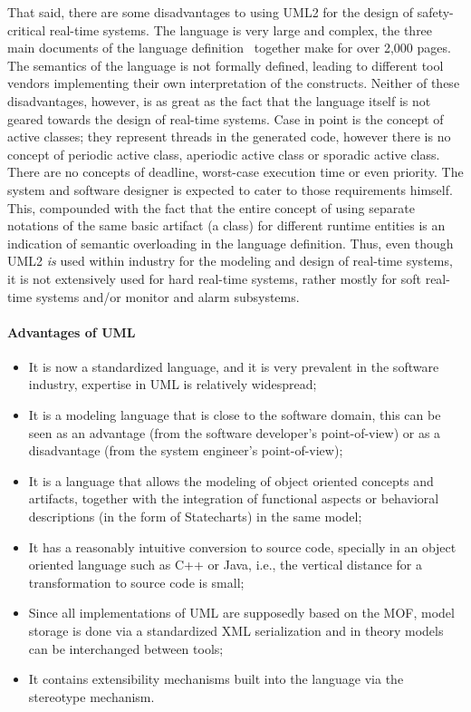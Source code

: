 That said, there are some disadvantages to using UML2 for the design
of safety-critical real-time systems. The language is very large and
complex, the three main documents of the language
definition~\cite{mof-std, uml-infra, uml-super} together make for over
2,000 pages. The semantics of the language is not formally defined,
leading to different tool vendors implementing their own
interpretation of the constructs. Neither of these disadvantages,
however, is as great as the fact that the language itself is not
geared towards the design of real-time systems. Case in point is the
concept of active classes; they represent threads in the generated
code, however there is no concept of periodic active class, aperiodic
active class or sporadic active class. There are no concepts of
deadline, worst-case execution time or even priority. The system and
software designer is expected to cater to those requirements
himself. This, compounded with the fact that the entire concept of
using separate notations of the same basic artifact (a class) for
different runtime entities is an indication of semantic overloading in
the language definition. Thus, even though UML2 \emph{is} used within
industry for the modeling and design of real-time systems, it is not
extensively used for hard real-time systems, rather mostly for soft
real-time systems and/or monitor and alarm subsystems.

\paragraph{Advantages of UML}
\begin{itemize}
\item{It is now a standardized language, and it is very prevalent in
  the software industry, expertise in UML is relatively widespread;}
\item{It is a modeling language that is close to the software domain,
  this can be seen as an advantage (from the software developer's
  point-of-view) or as a disadvantage (from the system engineer's
  point-of-view);}
\item{It is a language that allows the modeling of object oriented
  concepts and artifacts, together with the integration of functional
  aspects or behavioral descriptions (in the form of Statecharts) in
  the same model;}
\item{It has a reasonably intuitive conversion to source code,
  specially in an object oriented language such as C++ or Java, i.e.,
  the vertical distance for a transformation to source code is small;}
\item{Since all implementations of UML are supposedly based on the
  MOF, model storage is done via a standardized XML serialization and
  in theory models can be interchanged between tools;}
\item{It contains extensibility mechanisms built into the language via
  the stereotype mechanism.}
\end{itemize}

